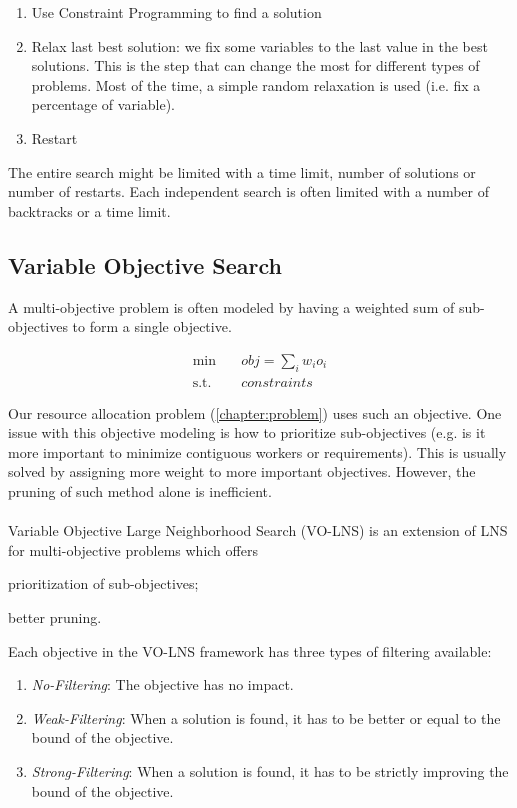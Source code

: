 \documentclass[../../thesis.tex]{subfiles}
\begin{document}
\begin{enumerate}
  \item Use Constraint Programming to find a solution 
  \item Relax last best solution: we fix some variables to the last value in the best solutions. This is the 
        step that can change the most for different types of problems. Most of the time, a simple random relaxation is used (i.e. fix a percentage of variable).
  \item Restart
\end{enumerate}

The entire search might be limited with a time limit, number of solutions or number of restarts. Each independent search 
is often limited with a number of backtracks or a time limit.

\subsection{Variable Objective Search}

A multi-objective problem is often modeled by having a weighted sum of sub-objectives to form a 
single objective. 

\begin{align*}
  \text{min} \quad & obj = \sum_{i} w_i o_i \\
  \text{s.t.} \quad & constraints
\end{align*}

Our resource allocation problem (\autoref{chapter:problem}) uses such an objective. One issue with this objective modeling is how 
to prioritize sub-objectives (e.g. is it more important to minimize contiguous workers or requirements). This is 
usually solved by assigning more weight to more important objectives. However, the pruning of such method alone is inefficient.

\paragraph{}

Variable Objective Large Neighborhood Search (VO-LNS) \cite{Schaus:VOLNS} is an extension of LNS for multi-objective 
problems which offers
\begin{enumerate*}[label=(\roman*)]
  \item prioritization of sub-objectives;
  \item better pruning.
\end{enumerate*}
Each objective in the VO-LNS framework has three types of filtering available:
\begin{enumerate}
  \item \emph{No-Filtering}: The objective has no impact.
  \item \emph{Weak-Filtering}: When a solution is found, it has to be better or equal to the bound of the objective. 
  \item \emph{Strong-Filtering}: When a solution is found, it has to be strictly improving the bound of the objective.
\end{enumerate}
\end{document}
